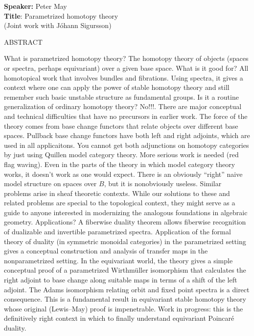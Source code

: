 \documentclass[12pt]{amsart}
\begin{document}
\noindent \textbf{Speaker:} Peter May \\
\textbf{Title}: Parametrized homotopy theory \\
\indent \indent \indent (Joint work with J\'ohann Sigur{\dh}sson)

\medskip

\begin{center} ABSTRACT \end{center}
  What is parametrized homotopy theory?  The
homotopy theory of objects (spaces or spectra, perhaps
equivariant)  over a given base space.  What is it good for? All
homotopical work that involves bundles and fibrations. Using
spectra, it gives a context where one can apply the power of
stable homotopy theory and still remember such basic unstable
structure as fundamental groups.  Is it a routine generalization
of ordinary homotopy theory? No!!!. There are major conceptual and
technical difficulties that have no precursors in earlier work.
 The force of the theory
comes  from base change functors that relate objects over
different  base spaces. Pullback base change functors have both
left and  right adjoints, which are used in all applicaitons. You
cannot  get both adjunctions on homotopy categories by just using
Quillen model category theory. More serious work is needed (red
flag waving).
  Even in the parts  of the theory in which model category theory works, it doesn't work as
one would expect. There is an obviously ``right'' naive model
 structure on spaces over $B$, but it is nonobviously useless.
  Similar problems arise in sheaf theoretic contexts.
 While  our
solutions to these and related problems are special to the
topological context, they might serve as a guide to anyone
interested in modernizing the analogous foundations in algebraic
geometry.  Applications?  A fiberwise duality  theorem allows
fiberwise recognition of dualizable  and invertible parametrized
spectra.  Application of the  formal theory of duality (in
symmetric monoidal categories) in the parametrized setting gives a
conceptual construction and analysis of transfer maps in the
nonparametrized setting.  In the equivariant world, the theory
gives a simple conceptual proof  of a parametrized Wirthm\"uller
isomorphism that calculates the right adjoint to base change along
suitable maps in terms of a shift of the left adjoint.
 The Adams isomorphism relating orbit and fixed  point
spectra is a direct consequence. This is a fundamental result in
equivariant stable homotopy theory whose original (Lewis--May)
proof is impenetrable.  Work in progress: this is the definitively
right context in which to finally understand equivariant
Poincar\'e duality.
\end{document}
